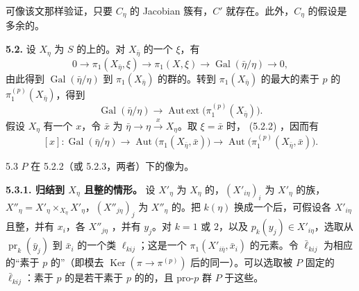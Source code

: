 可像该文那样验证，只要 $C_\eta$ 的 Jacobian 簇有，$C'$ 就存在。此外，$C_\eta$ 的假设是多余的。

\textbf{5.2.} 设 $X_\eta$ 为 $S$ 的上的。对 $X_{\bar\eta}$ 的一个 $\xi$，有
\[
0\longrightarrow\pi_1(X_{\bar\eta},\xi)\longrightarrow\pi_1(X,\xi)
\longrightarrow\operatorname{Gal}(\bar\eta/\eta)\longrightarrow0,\tag{5.2.1}
\]
由此得到 $\operatorname{Gal}(\bar\eta/\eta)$ 到 $\pi_1(X_{\bar\eta})$ 的群的。转到 $\pi_1(X_{\bar\eta})$ 的最大的素于 $p$ 的 $\pi_1^{(p)}(X_{\bar\eta})$，得到
\[
\operatorname{Gal}(\bar\eta/\eta)\longrightarrow
\operatorname{Aut\,ext}\bigl(\pi_1^{(p)}(X_{\bar\eta})\bigr).\tag{5.2.2}
\]
假设 $X_\eta$ 有一个 $x$，令 $\bar x$ 为 $\bar\eta\to\eta\xrightarrow{x}X_\eta$。取 $\xi=\bar x$ 时， (5.2.2) ，因而有
\[
[x]:\operatorname{Gal}(\bar\eta/\eta)\longrightarrow
\operatorname{Aut}\bigl(\pi_1(X_{\bar\eta},\bar x)\bigr)
\longrightarrow\operatorname{Aut}\bigl(\pi_1^{(p)}(X_{\bar\eta},\bar x)\bigr).\tag{5.2.3}
\]
\begin{SGAresult}{}{5.3}
$P$ 在 5.2.2（或 5.2.3，两者）下的像为。
\end{SGAresult}
\textbf{5.3.1. 归结到 $X_\eta$ 且整的情形。}
设 $X'_\eta$ 为 $X_\eta$ 的，$(X'_{i\eta})_i$ 为 $X'_\eta$ 的族，$X''_\eta=X'_\eta\times_{X_\eta}X'_\eta$，$(X''_{j\eta})_j$ 为 $X''_\eta$ 的。把 $k(\eta)$ 换成一个后，可假设各 $X'_{i\eta}$ 且整，并有 $x_i$，各 $X''_{j\eta}$ ，并有 $y_j$。对 $k=1$ 或 $2$，以及 $p_k(y_j)\in X'_{i\eta}$，选取从 $\operatorname{pr}_k(\bar y_j)$ 到 $\bar x_i$ 的一个类 $\ell_{kij}$；这是一个 $\pi_1(X'_{i\bar\eta},\bar x_i)$ 的元素。令 $\bar\ell_{kij}$ 为相应的“素于 $p$ 的”（即模去 $\operatorname{Ker}(\pi\to\pi^{(p)})$ 后的同一）。可以选取被 $P$ 固定的 $\bar\ell_{kij}$：素于 $p$ 的是若干素于 $p$ 的的，且 pro-$p$ 群 $P$ 于这些。

